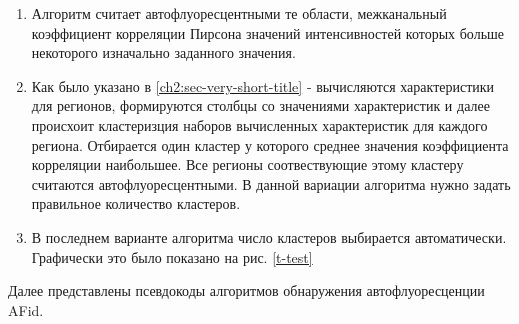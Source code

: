 \begin{enumerate}[1.] \label{variations}
	\item Алгоритм считает автофлуоресцентными те области, межканальный коэффициент корреляции Пирсона значений интенсивностей которых больше некоторого изначально заданного значения.
	
	\item Как было указано в \ref{ch2:sec-very-short-title} - вычисляются характеристики для регионов, формируются столбцы со значениями характеристик и далее происхоит кластеризция наборов вычисленных характеристик для каждого региона. Отбирается один кластер у которого среднее значения коэффициента корреляции наибольшее. Все регионы соотвествующие этому кластеру считаются автофлуоресцентными.  В данной вариации алгоритма нужно задать правильное количество кластеров.
	
	\item В последнем варианте алгоритма число кластеров выбирается автоматически. Графически это было показано на рис. \ref{t-test}
\end{enumerate}

Далее представлены псевдокоды алгоритмов обнаружения автофлуоресценции AFid.\cite{Conference}


\begin{algorithm} [H]
	\nonl{}
	\label{alg:AlgoAuto}
\end{algorithm} 



